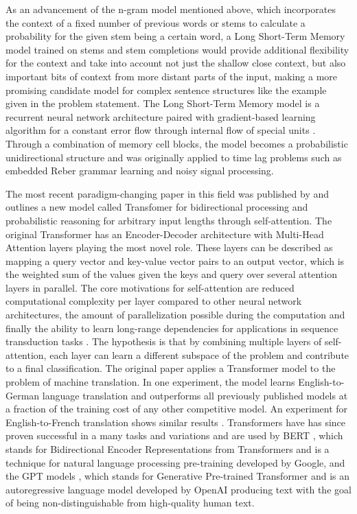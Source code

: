 \documentclass[11pt]{article}
\begin{document}
As an advancement of the n-gram model mentioned above, which incorporates the context of a fixed number of previous words or stems to calculate a probability for the given stem being a certain word, a Long Short-Term Memory model \citep{lstm} trained on stems and stem completions would provide additional flexibility for the context and take into account not just the shallow close context, but also important bits of context from more distant parts of the input, making a more promising candidate model for complex sentence structures like the example given in the problem statement. The Long Short-Term Memory model is a recurrent neural network architecture paired with gradient-based learning algorithm for a constant error flow through internal flow of special units \citep{lstm}. Through a combination of memory cell blocks, the model becomes a probabilistic unidirectional structure and was originally applied to time lag problems such as embedded Reber grammar learning and noisy signal processing.

The most recent paradigm-changing paper in this field was published by \cite{transformerOrig} and outlines a new model called Transfomer for bidirectional processing and probabilistic reasoning for arbitrary input lengths through self-attention. 
The original Transformer has an Encoder-Decoder architecture with Multi-Head Attention layers playing the most novel role. These layers can be described as mapping a query vector and key-value vector pairs to an output vector, which is the weighted sum of the values given the keys and query over several attention layers in parallel. The core motivations for self-attention are reduced computational complexity per layer compared to other neural network architectures, the amount of parallelization possible during the computation and finally the ability to learn long-range dependencies for applications in sequence transduction tasks \citep{transformerOrig}.
The hypothesis is that by combining multiple layers of self-attention, each layer can learn a different subspace of the problem and contribute to a final classification. The original paper applies a Transformer model to the problem of machine translation.
In one experiment, the model learns English-to-German language translation and outperforms all previously published models at a fraction of the training cost of any other competitive model. An experiment for English-to-French translation shows similar results \citep{transformerOrig}. Transformers have has since proven successful in a many tasks and variations and are used by BERT \citep{bert}, which stands for Bidirectional Encoder Representations from Transformers and is a technique for natural language processing pre-training developed by Google, and the GPT models \citep{gpt}, which stands for Generative Pre-trained Transformer and is an autoregressive language model developed by OpenAI producing text with the goal of being non-distinguishable from high-quality human text.
\end{document}
